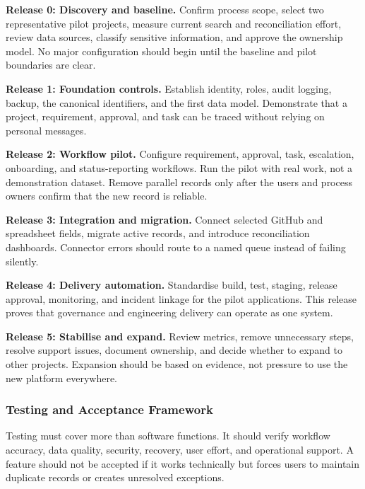 \documentclass[12pt,a4paper]{report}
\begin{document}
\textbf{Release 0: Discovery and baseline.} Confirm process scope, select two representative pilot
projects, measure current search and reconciliation effort, review data sources, classify sensitive
information, and approve the ownership model. No major configuration should begin until the
baseline and pilot boundaries are clear.

\textbf{Release 1: Foundation controls.} Establish identity, roles, audit logging, backup, the
canonical identifiers, and the first data model. Demonstrate that a project, requirement, approval,
and task can be traced without relying on personal messages.

\textbf{Release 2: Workflow pilot.} Configure requirement, approval, task, escalation, onboarding,
and status-reporting workflows. Run the pilot with real work, not a demonstration dataset. Remove
parallel records only after the users and process owners confirm that the new record is reliable.

\textbf{Release 3: Integration and migration.} Connect selected GitHub and spreadsheet fields,
migrate active records, and introduce reconciliation dashboards. Connector errors should route to a
named queue instead of failing silently.

\textbf{Release 4: Delivery automation.} Standardise build, test, staging, release approval,
monitoring, and incident linkage for the pilot applications. This release proves that governance and
engineering delivery can operate as one system.

\textbf{Release 5: Stabilise and expand.} Review metrics, remove unnecessary steps, resolve support
issues, document ownership, and decide whether to expand to other projects. Expansion should be
based on evidence, not pressure to use the new platform everywhere.

\subsubsection{Testing and Acceptance Framework}
\label{sec:testing-acceptance}

Testing must cover more than software functions. It should verify workflow accuracy, data quality,
security, recovery, user effort, and operational support. A feature should not be accepted if it works
technically but forces users to maintain duplicate records or creates unresolved exceptions.
\end{document}
